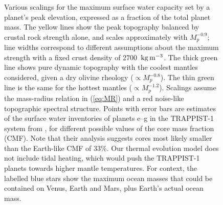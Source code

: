 \documentclass[trackchanges]{aastex63}
\begin{document}
 
\begin{figure}
    \centering
    \caption{Various scalings for the maximum surface water capacity set by a planet's peak elevation, expressed as a fraction of the total planet mass. The yellow lines show the peak topography balanced by crustal rock strength alone, and scales approximately with $M_p^{-0.9}$; line widths correspond to different assumptions about the maximum strength with a fixed crust density of 2700~$\rm{kg\,m^{-3}}$. The thick green line shows pure dynamic topography with the coolest mantles considered, given a dry olivine rheology ($\propto M_p^{-0.8}$). The thin green line is the same for the hottest mantles ($\propto M_p^{-1.2}$). Scalings assume the mass-radius relation in (\ref{eq:MR}) and a red noise-like topographic spectral structure. Points with error bars are estimates of the surface water inventories of planets e--g in the TRAPPIST-1 system from \citet{agol_refining_2021}, for different possible values of the core mass fraction (CMF). Note that their analysis suggests cores most likely smaller than the Earth-like CMF of 33\%. Our thermal evolution model does not include tidal heating, which would push the TRAPPIST-1 planets towards higher mantle temperatures. For context, the labelled blue stars show the maximum ocean masses that could be contained on Venus, Earth and Mars, plus Earth's actual ocean mass.}
    \label{fig:max-ocn}
\end{figure}
 

\end{document}
